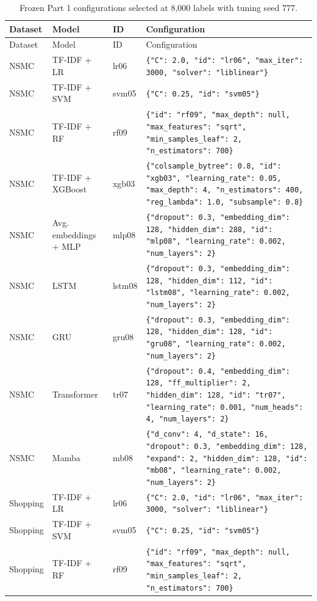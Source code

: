 \begin{longtable}{lll >{\raggedright\arraybackslash}p{7.2cm}}
\caption{Frozen Part 1 configurations selected at 8,000 labels with tuning seed 777.}\label{tab:selected-configs}\\
\toprule
Dataset & Model & ID & Configuration \\
\midrule
\endfirsthead
\toprule
Dataset & Model & ID & Configuration \\
\midrule
\endhead
NSMC & TF-IDF + LR & lr06 & \texttt{\{"C": 2.0, "id": "lr06", "max\_iter": 3000, "solver": "liblinear"\}} \\
NSMC & TF-IDF + SVM & svm05 & \texttt{\{"C": 0.25, "id": "svm05"\}} \\
NSMC & TF-IDF + RF & rf09 & \texttt{\{"id": "rf09", "max\_depth": null, "max\_features": "sqrt", "min\_samples\_leaf": 2, "n\_estimators": 700\}} \\
NSMC & TF-IDF + XGBoost & xgb03 & \texttt{\{"colsample\_bytree": 0.8, "id": "xgb03", "learning\_rate": 0.05, "max\_depth": 4, "n\_estimators": 400, "reg\_lambda": 1.0, "subsample": 0.8\}} \\
NSMC & Avg. embeddings + MLP & mlp08 & \texttt{\{"dropout": 0.3, "embedding\_dim": 128, "hidden\_dim": 288, "id": "mlp08", "learning\_rate": 0.002, "num\_layers": 2\}} \\
NSMC & LSTM & lstm08 & \texttt{\{"dropout": 0.3, "embedding\_dim": 128, "hidden\_dim": 112, "id": "lstm08", "learning\_rate": 0.002, "num\_layers": 2\}} \\
NSMC & GRU & gru08 & \texttt{\{"dropout": 0.3, "embedding\_dim": 128, "hidden\_dim": 128, "id": "gru08", "learning\_rate": 0.002, "num\_layers": 2\}} \\
NSMC & Transformer & tr07 & \texttt{\{"dropout": 0.4, "embedding\_dim": 128, "ff\_multiplier": 2, "hidden\_dim": 128, "id": "tr07", "learning\_rate": 0.001, "num\_heads": 4, "num\_layers": 2\}} \\
NSMC & Mamba & mb08 & \texttt{\{"d\_conv": 4, "d\_state": 16, "dropout": 0.3, "embedding\_dim": 128, "expand": 2, "hidden\_dim": 128, "id": "mb08", "learning\_rate": 0.002, "num\_layers": 2\}} \\
Shopping & TF-IDF + LR & lr06 & \texttt{\{"C": 2.0, "id": "lr06", "max\_iter": 3000, "solver": "liblinear"\}} \\
Shopping & TF-IDF + SVM & svm05 & \texttt{\{"C": 0.25, "id": "svm05"\}} \\
Shopping & TF-IDF + RF & rf09 & \texttt{\{"id": "rf09", "max\_depth": null, "max\_features": "sqrt", "min\_samples\_leaf": 2, "n\_estimators": 700\}} \\

\end{longtable}
